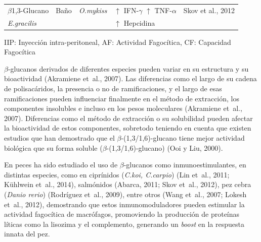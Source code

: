 \documentclass[12pt,letterpaper,oneside]{scrbook}
\begin{document}
\begin{table}[h!]
\begin{center}
\begin{threeparttable}
\begin{tabularx}{\textwidth}{l l l X l}
                $\beta$1,3-Glucano              &   Baño                & \emph{O.mykiss}               & $\uparrow$ IFN-$\gamma$ $\uparrow$ TNF-$\alpha$           & Skov et al., 2012             \\
                \emph{E.gracilis}               &                       &                               & $\uparrow$ Hepcidina          &                       \\
                \bottomrule
            \end{tabularx}
            \begin{tablenotes}
                \item IIP: Inyección intra-peritoneal, AF: Actividad Fagocítica, CF: Capacidad Fagocítica \\
            \end{tablenotes}
        \end{threeparttable}
    \end{center}
\end{table}

\(\beta\)-glucanos derivados de diferentes especies pueden variar en su
estructura y su bioactividad (Akramiene et~al., 2007). Las diferencias
como el largo de su cadena de polisacáridos, la presencia o no de
ramificaciones, y el largo de esas ramificaciones pueden influenciar
finalmente en el método de extracción, los componentes insolubles e
incluso en los pesos moleculares (Akramiene et~al., 2007). Diferencias
como el método de extracción o su solubilidad pueden afectar la
bioactividad de estos componentes, sobretodo teniendo en cuenta que
existen estudios que han demostrado que el \(\beta\)-(1,3/1,6)-glucano
tiene mejor actividad biológica que su forma soluble
(\(\beta\)-(1,3/1,6)-glucano) (Ooi y Liu, 2000).

En peces ha sido estudiado el uso de \(\beta\)-glucanos como
inmunoestimulantes, en distintas especies, como en ciprínidos
(\emph{C.koi, C.carpio}) (Lin et~al., 2011; Kühlwein et~al., 2014),
salmónidos (Abarca, 2011; Skov et~al., 2012), pez cebra
(\emph{Danio rerio}) (Rodríguez et~al., 2009), entre otros (Wang et~al.,
2007; Lokesh et~al., 2012), demostrando que estos inmunomoduladores
pueden estimular la actividad fagocítica de macrófagos, promoviendo la
producción de proteínas líticas como la lisozima y el complemento,
generando un \emph{boost} en la respuesta innata del pez.
\end{document}
